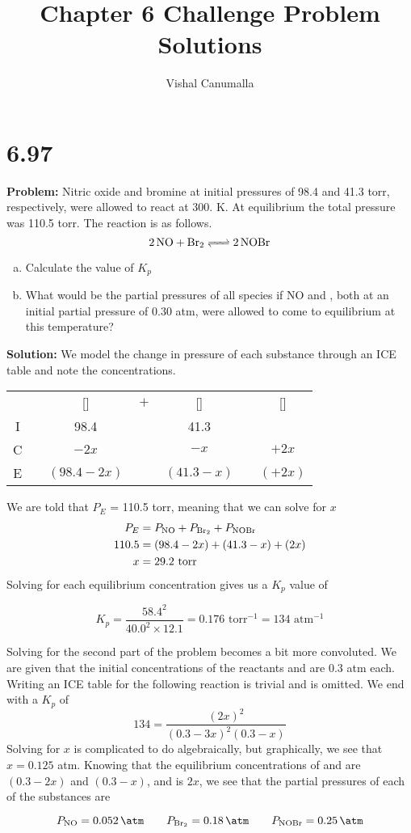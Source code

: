 \documentclass[11 pt]{article}
\title{Chapter 6 Challenge Problem Solutions}
\author{Vishal Canumalla}
\makeatletter
\newcommand{\icetable}[9]{
    \begin{tabular}{cc@{}c@{}c@{}c@{}c@{}c}

    & &   [\ce{#2#1}]& ${}+{}$ & [\ce{#4#3}] & \ce{<=>}& [\ce{#6#5}]\\
 
  I & &       #7    &&   #8                      &&  #9    \\
  C & &       $- #2x$    &&   $- #4x$                         &&  $+ #6x$    \\
  E & &       $(#7 - #2x)$    &&   $(#8 - #4x)$                         &&  $(#9 + #6x)$    \\
 
    \end{tabular}


}
\makeatother
\begin{document}
    
    \maketitle
    
    \section*{6.97} 
    \begin{problemBox}
        \textbf{Problem:} Nitric oxide and bromine at initial pressures of 98.4 and 41.3 torr, respectively, were allowed to react at 300. K. At equilibrium the total pressure was 110.5 torr. The reaction is as follows.
        $$\ce{2NO + Br2 <=> 2NOBr}$$
        \begin{enumerate}[a)]
                \item Calculate the value of $K_p$
                \item What would be the partial pressures of all species if
            NO and , both at an initial partial pressure of
            0.30 atm, were allowed to come to equilibrium at
            this temperature?
        \end{enumerate}
    \end{problemBox}
    \textbf{Solution:} We model the change in pressure of each substance through an ICE table and note the concentrations.
    \begin{center}
         \icetable{NO}{2}{Br2}{}{NOBr}{2}{98.4}{41.3}{}
    \end{center}
    We are told that $P_{E}$ = 110.5 torr, meaning that we can solve for $x$
    \begin{align*}
            P_E &= P_{\ce{NO}} + P_{\ce{Br2}} + P_{\ce{NOBr}} \\
                110.5 &= (98.4 - 2x) + (41.3 - x) + (2x) \\
                x &= 29.2 \text{ torr}
    \end{align*}
    Solving for each equilibrium concentration gives us a $K_p$ value of 
    \begin{answerBox}
          $$K_p = \frac{58.4^2}{40.0^2 \times 12.1} = 0.176 \text{ torr}^{-1} = 134 \text{ atm}^{-1}$$
    \end{answerBox}
    Solving for the second part of the problem becomes a bit more convoluted. We are given that the initial concentrations of the reactants  and  are 
    0.3 atm each. Writing an ICE table for the following reaction is trivial and is omitted. We end with a $K_p$ of 
    $$134 =  \frac{(2x)^2}{(0.3-3x)^2(0.3-x)}$$
    Solving for $x$ is complicated to do algebraically, but graphically, we see that $x = 0.125$ atm. Knowing
    that the equilibrium concentrations of  and  are $(0.3 - 2x)$ and $(0.3 - x)$, and 
     is $2x$, we see that the partial pressures of each of the substances are
    \begin{answerBox}
      $$ P_{\ce{NO}} = \SI{0.052}{\atm} \qquad P_{\ce{Br2}} = \SI{0.18}{\atm} \qquad P_{\ce{NOBr}} = \SI{0.25}{\atm}$$
    \end{answerBox}
\end{document}
